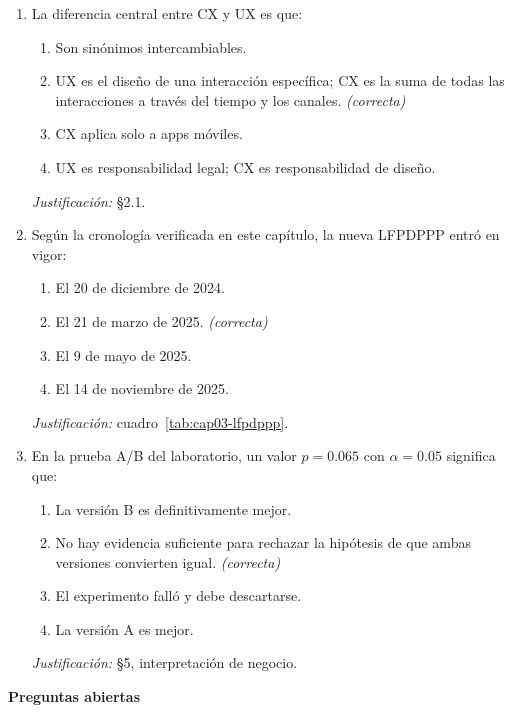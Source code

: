 \begin{enumerate}
  \item La diferencia central entre CX y UX es que:
  \begin{enumerate}
    \item[a)] Son sinónimos intercambiables.
    \item[b)] UX es el diseño de una interacción específica; CX es la suma de todas las interacciones a través del tiempo y los canales. \textit{(correcta)}
    \item[c)] CX aplica solo a apps móviles.
    \item[d)] UX es responsabilidad legal; CX es responsabilidad de diseño.
  \end{enumerate}
  \textit{Justificación:} §2.1.

  \item Según la cronología verificada en este capítulo, la nueva LFPDPPP
  entró en vigor:
  \begin{enumerate}
    \item[a)] El 20 de diciembre de 2024.
    \item[b)] El 21 de marzo de 2025. \textit{(correcta)}
    \item[c)] El 9 de mayo de 2025.
    \item[d)] El 14 de noviembre de 2025.
  \end{enumerate}
  \textit{Justificación:} cuadro~\ref{tab:cap03-lfpdppp}.

  \item En la prueba A/B del laboratorio, un valor $p=0.065$ con
  $\alpha=0.05$ significa que:
  \begin{enumerate}
    \item[a)] La versión B es definitivamente mejor.
    \item[b)] No hay evidencia suficiente para rechazar la hipótesis de que ambas versiones convierten igual. \textit{(correcta)}
    \item[c)] El experimento falló y debe descartarse.
    \item[d)] La versión A es mejor.
  \end{enumerate}
  \textit{Justificación:} §5, interpretación de negocio.
\end{enumerate}

\textbf{Preguntas abiertas}

